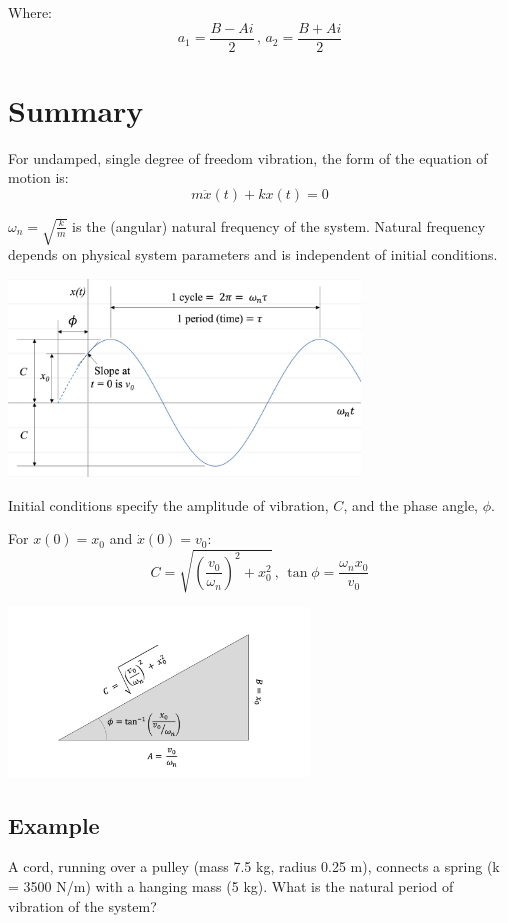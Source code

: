 \documentclass[12pt,letterpaper,twoside]{report}
\begin{document}
Where:
\[
a_1 = \frac{B - Ai}{2} \, , \, a_2 = \frac{B + Ai}{2}
\]

\newpage

\section{Summary}
For undamped, single degree of freedom vibration, the form of the equation of motion is:
\[
m \ddot{x} (t) + kx(t) = 0
\]
\vspace*{2\baselineskip}

$\displaystyle \omega_n = \sqrt{\frac{k}{m}}$ is the (angular) natural frequency of the system.  Natural frequency depends on physical system parameters and is independent of initial conditions. 

\includegraphics[trim={0cm 0cm 0cm 0cm},clip,width=0.7\textwidth, center]{Slide75}

Initial conditions specify the amplitude of vibration, $C$, and the phase angle, $\phi$.  

For $x(0) = x_0$ and $\dot{x} (0) = v_0$:
\[
\displaystyle C=\sqrt{\left( \frac{v_0}{\omega_n} \right)^2 + x_0^2} \, , \, \tan \phi  = \frac{\omega_n x_0}{v_0}
\]

\includegraphics[trim={2cm 0cm 2cm 1cm},clip,width=0.6\textwidth, center]{Slide76}

\newpage

\subsection{Example}
A cord, running over a pulley (mass 7.5 kg, radius 0.25 m), connects a spring (k = 3500 N/m) with a hanging mass (5 kg). What is the natural period of vibration of the system?
\end{document}
